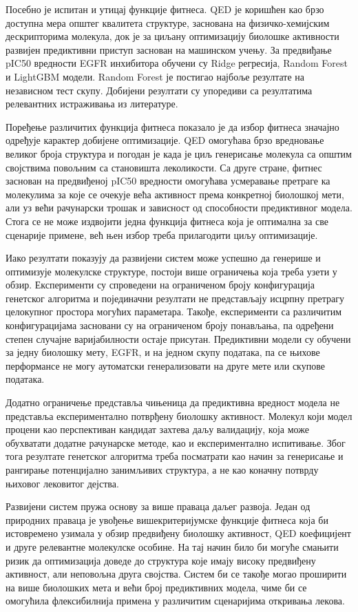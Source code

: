 \documentclass[12pt,oneside]{memoir}
\begin{document}
Посебно је испитан и утицај функције фитнеса. 
QED је коришћен као брзо доступна мера општег квалитета структуре, 
заснована на физичко-хемијским дескрипторима молекула, док је за 
циљану оптимизацију биолошке активности развијен предиктивни 
приступ заснован на машинском учењу. За предвиђање pIC50 
вредности EGFR инхибитора обучени су Ridge регресија, 
Random Forest и LightGBM модели. Random Forest је постигао 
најбоље резултате на независном тест скупу. 
Добијени резултати су упоредиви са резултатима релевантних 
истраживања из литературе. 

Поређење различитих функција фитнеса показало је да избор 
фитнеса значајно одређује карактер добијене оптимизације. 
QED омогућава брзо вредновање великог броја структура и 
погодан је када је циљ генерисање молекула са општим 
својствима повољним са становишта леколикости. Са друге 
стране, фитнес заснован на предвиђеној pIC50 вредности 
омогућава усмеравање претраге ка молекулима за које се 
очекује већа активност према конкретној биолошкој мети, 
али уз већи рачунарски трошак и зависност од способности 
предиктивног модела. Стога се не може издвојити једна 
функција фитнеса која је оптимална за све сценарије примене, 
већ њен избор треба прилагодити циљу оптимизације.

Иако резултати показују да развијени систем може успешно да 
генерише и оптимизује молекулске структуре, постоји више 
ограничења која треба узети у обзир. Експерименти су 
спроведени на ограниченом броју конфигурација генетског 
алгоритма и појединачни резултати не представљају исцрпну 
претрагу целокупног простора могућих параметара. Такође, 
експерименти са различитим конфигурацијама засновани су на 
ограниченом броју понављања, па одређени степен случајне 
варијабилности остаје присутан. Предиктивни модели су обучени 
за једну биолошку мету, EGFR, и на једном скупу података, па 
се њихове перформансе не могу аутоматски генерализовати на 
друге мете или скупове података.

Додатно ограничење представља чињеница да предиктивна 
вредност модела не представља експериментално потврђену 
биолошку активност. Молекул који модел процени као 
перспективан кандидат захтева даљу валидацију, која може 
обухватати додатне рачунарске методе, као и 
експериментално испитивање. Због тога резултате 
генетског алгоритма треба посматрати као начин за 
генерисање и рангирање потенцијално занимљивих структура, 
а не као коначну потврду њиховог лековитог дејства.

Развијени систем пружа основу за више праваца даљег развоја. 
Један од природних праваца је увођење вишекритеријумске 
функције фитнеса која би истовремено узимала у обзир 
предвиђену биолошку активност, QED коефицијент и друге 
релевантне молекулске особине. На тај начин било би могуће 
смањити ризик да оптимизација доведе до структура које 
имају високу предвиђену активност, али неповољна друга својства. 
Систем би се такође могао проширити на више биолошких мета и 
већи број предиктивних модела, чиме би се омогућила 
флексибилнија примена у различитим сценаријима откривања лекова.
\end{document}
